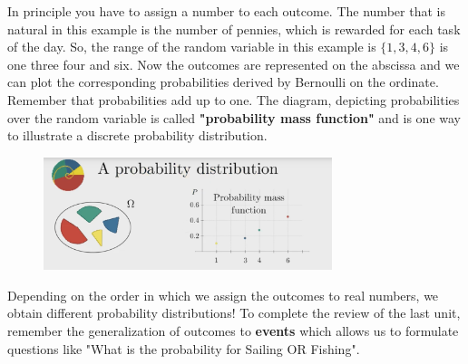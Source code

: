 \documentclass[12pt, a4paper]{scrartcl}
\begin{document}
In principle you have to assign a number to each outcome. The number that is natural in this example is the number of pennies, which is rewarded for each task of the day. 
So, the range of the random variable in this example is $\{1,3,4,6\}$  is one three four and six.%
Now the outcomes are represented on the abscissa and we can plot the corresponding probabilities derived by Bernoulli on the ordinate. Remember that probabilities add up to one.
The diagram, depicting probabilities over the random variable is called \textbf{"probability mass function"} and is one way to illustrate a discrete probability distribution.
\begin{figure}[H]
	\centering
	\includegraphics[width=0.75\textwidth]{2_2.png}
\end{figure}
Depending on the order in which we assign the outcomes to real numbers, we obtain different probability distributions!
To complete the review of the last unit, remember the generalization of outcomes to \textbf{events} which allows us to formulate questions like 
"What is the probability for Sailing OR Fishing".\\

\\
\end{document}
